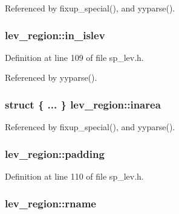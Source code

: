 Referenced by fixup\+\_\+special(), and yyparse().

\hypertarget{structlev__region_ae6ed5c772b8107a84076d5d25963dc1a}{
\subsubsection[{in\+\_\+islev}]{ lev\+\_\+region\+::in\+\_\+islev}}\label{structlev__region_ae6ed5c772b8107a84076d5d25963dc1a}


Definition at line 109 of file sp\+\_\+lev.\+h.



Referenced by yyparse().

\hypertarget{structlev__region_ae7cf45ca96c972e2dc4821fec42896ad}{
\subsubsection[{inarea}]{\setlength{\rightskip}{0pt plus 5cm}struct \{ ... \}   lev\+\_\+region\+::inarea}}\label{structlev__region_ae7cf45ca96c972e2dc4821fec42896ad}


Referenced by fixup\+\_\+special(), and yyparse().

\hypertarget{structlev__region_a368470df9ece324104871a2fa10733fa}{
\subsubsection[{padding}]{ lev\+\_\+region\+::padding}}\label{structlev__region_a368470df9ece324104871a2fa10733fa}


Definition at line 110 of file sp\+\_\+lev.\+h.

\hypertarget{structlev__region_a1ffe181e974927ec122af731747ef8c7}{
\subsubsection[{rname}]{ lev\+\_\+region\+::rname}}\label{structlev__region_a1ffe181e974927ec122af731747ef8c7}


